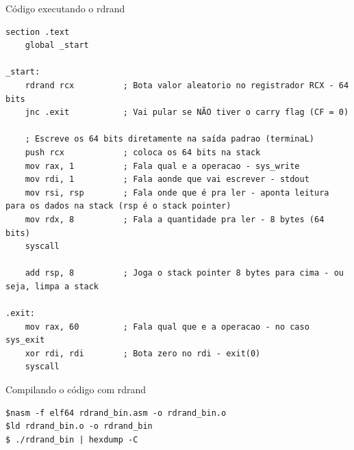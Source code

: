\begin{frame}[fragile]{Código executando o rdrand}
    \tiny
    \begin{verbatim}
section .text
    global _start

_start:
    rdrand rcx          ; Bota valor aleatorio no registrador RCX - 64 bits
    jnc .exit           ; Vai pular se NÃO tiver o carry flag (CF = 0)

    ; Escreve os 64 bits diretamente na saída padrao (terminaL)
    push rcx            ; coloca os 64 bits na stack
    mov rax, 1          ; Fala qual e a operacao - sys_write
    mov rdi, 1          ; Fala aonde que vai escrever - stdout
    mov rsi, rsp        ; Fala onde que é pra ler - aponta leitura para os dados na stack (rsp é o stack pointer)
    mov rdx, 8          ; Fala a quantidade pra ler - 8 bytes (64 bits)
    syscall

    add rsp, 8          ; Joga o stack pointer 8 bytes para cima - ou seja, limpa a stack

.exit:
    mov rax, 60         ; Fala qual que e a operacao - no caso sys_exit
    xor rdi, rdi        ; Bota zero no rdi - exit(0)
    syscall
    \end{verbatim}
\end{frame}

\begin{frame}[fragile]{Compilando o código com rdrand}
    \begin{verbatim}
$nasm -f elf64 rdrand_bin.asm -o rdrand_bin.o
$ld rdrand_bin.o -o rdrand_bin
$ ./rdrand_bin | hexdump -C

\end{verbatim}

\end{frame}
